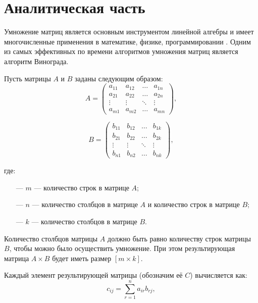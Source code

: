\chapter{Аналитическая часть}

Умножение матриц является основным инструментом линейной алгебры и имеет многочисленные применения в математике, физике, программировании \cite{article}. Одним из самых
эффективных по времени алгоритмов умножения матриц является алгоритм Винограда.

Пусть матрицы $A$ и $B$ заданы следующим образом:
\begin{equation}
	A = \left(
	\begin{array}{cccc}
		a_{11} & a_{12} & \ldots & a_{1n}\\
		a_{21} & a_{22} & \ldots & a_{2n}\\
		\vdots & \vdots & \ddots & \vdots\\
		a_{m1} & a_{m2} & \ldots & a_{mn}
	\end{array}
	\right),
\end{equation}

\begin{equation}
	B = \left(
	\begin{array}{cccc}
		b_{11} & b_{12} & \ldots & b_{1k}\\
		b_{21} & b_{22} & \ldots & b_{2k}\\
		\vdots & \vdots & \ddots & \vdots\\
		b_{n1} & b_{n2} & \ldots & b_{nk}
	\end{array}
	\right),
\end{equation}

где: 
\begin{itemize}
	\item[---] $m$ --- количество строк в матрице $A$;
	\item[---] $n$ --- количество столбцов в матрице $A$ и количество строк в матрице $B$;
	\item[---] $k$ --- количество столбцов в матрице $B$.
\end{itemize}

Количество столбцов матрицы $A$ должно быть равно количеству строк матрицы $B$, чтобы можно было осуществить умножение. При этом результирующая матрица $A \times B$ будет иметь размер $[m \times k]$. 

Каждый элемент результирующей матрицы (обозначим её $C$) вычисляется как:
\begin{equation}
	c_{ij} = \displaystyle\sum_{r=1}^{n} a_{ir} b_{rj},
\end{equation}

